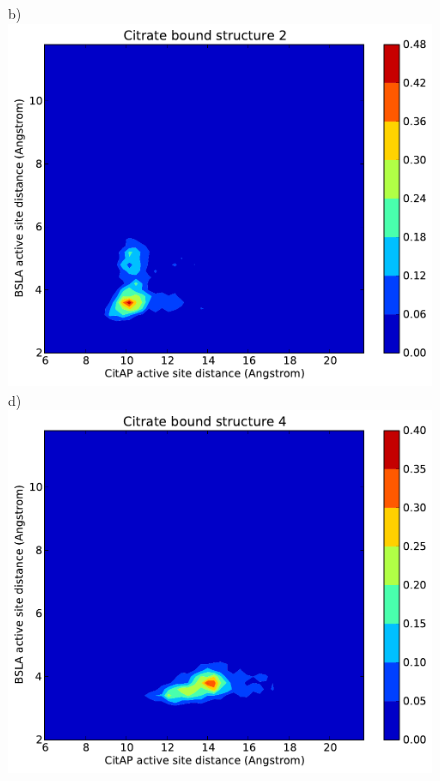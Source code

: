 \documentclass[english, a4paper, 12pt, titlepage, draft]{article}
\begin{document}
\begin{figure}
\begin{minipage}[]{0.45\linewidth}
    \end{minipage}
\hspace{0.5cm}
    \begin{minipage}[]{0.45\linewidth}
        \centering
        b)
        \includegraphics[width=\textwidth]{figures/CitAP_BSLA_distance/BSLA_CitAP_distance_bound_contour_structure2.pdf}  
        d)
        \includegraphics[width=\textwidth]{figures/CitAP_BSLA_distance/BSLA_CitAP_distance_bound_contour_structure4.pdf}  

\end{minipage}
\end{figure}
\end{document}
